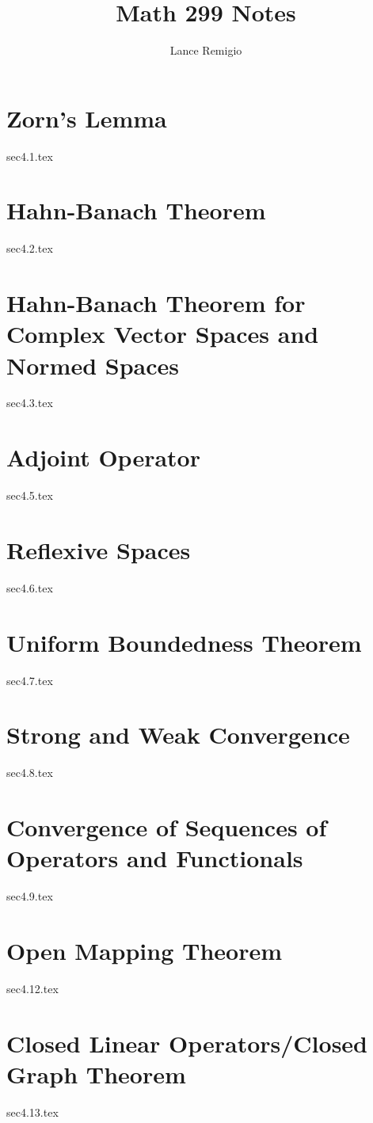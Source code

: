 \documentclass[a4paper]{article}
\title{Math 299 Notes}
\author{Lance Remigio}
\begin{document}
\maketitle
\tableofcontents

\section{Zorn's Lemma}

{sec4.1.tex}

\section{Hahn-Banach Theorem}

{sec4.2.tex}

\section{Hahn-Banach Theorem for Complex Vector Spaces and Normed Spaces}

{sec4.3.tex}

\section{Adjoint Operator}

{sec4.5.tex}

\section{Reflexive Spaces}

{sec4.6.tex}

\section{Uniform Boundedness Theorem}

{sec4.7.tex}

\section{Strong and Weak Convergence}

{sec4.8.tex}

\section{Convergence of Sequences of Operators and Functionals}

{sec4.9.tex}

\section{Open Mapping Theorem}

{sec4.12.tex}

\section{Closed Linear Operators/Closed Graph Theorem}

{sec4.13.tex}
\end{document}

